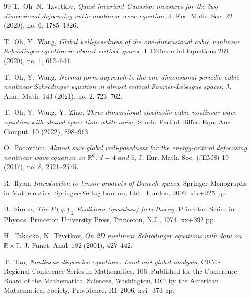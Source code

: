 \documentclass[%
11pt,  reqno]{amsart}
\newcommand{\1}{\hspace{0.2mm}\text{I}\hspace{0.2mm}}
\newcommand{\R}{\mathbb{R}}
\newcommand{\T}{\mathbb{T}}
\numberwithin{equation}{section}
\numberwithin{theorem}{section}
\begin{document}
\begin{thebibliography}{99}
T.~Oh, N.~Tzvetkov,
{\it  Quasi-invariant Gaussian measures for the two-dimensional defocusing cubic nonlinear wave equation}, J. Eur. Math. Soc. 22 (2020), no. 6, 1785--1826. 




T.~Oh, Y.~Wang, 
{\it Global well-posedness of the one-dimensional cubic nonlinear Schr\"odinger equation in almost critical spaces}, J. Differential Equations 269 (2020), no. 1, 612--640. 


T.~Oh, Y.~Wang, 
{\it Normal form approach to the one-dimensional periodic cubic nonlinear Schr\"odinger equation in almost critical Fourier-Lebesgue spaces}, J. Anal. Math. 143 (2021), no. 2, 723--762. 

T.~Oh, Y.~Wang, Y.~Zine, 
{\it Three-dimensional stochastic cubic nonlinear wave equation with almost space-time white noise,} 
Stoch. Partial Differ. Equ. Anal. Comput. 10 (2022), 898--963.




O.~Pocovnicu, 
{\it Almost sure global well-posedness for the energy-critical defocusing nonlinear wave equation on 
$\R^d$, $d = 4$ and $5$}, J. Eur. Math. Soc. (JEMS) 19 (2017), no. 8, 2521--2575. 






R.~Ryan, 
{\it Introduction to tensor products of Banach spaces}, 
Springer Monographs in Mathematics. Springer-Verlag London, Ltd., London, 2002. xiv+225 pp. 





B.~Simon, 
{\it  The $P(\varphi)_2$ Euclidean (quantum) field theory,} Princeton Series in Physics. Princeton University Press, Princeton, N.J., 1974. xx+392 pp.



H.~Takaoka, N.~Tzvetkov, 
{\it On 2D nonlinear Schr\"odinger equations with data on $\R \times \T$}, 
J. Funct. Anal. 182 (2001), 427--442.


T.~Tao, {\it Nonlinear dispersive equations. Local and global analysis,} CBMS Regional Conference Series in Mathematics, 106. Published for the Conference Board of the Mathematical Sciences, Washington, DC; by the American Mathematical Society, Providence, RI, 2006. xvi+373 pp.




\end{thebibliography}
\end{document}
